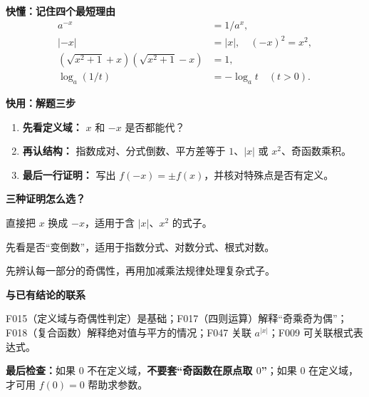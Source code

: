 \begin{summarybox}
\textbf{\textcolor{CSummary}{快懂：记住四个最短理由}}
\[
\begin{aligned}
 a^{-x}&=1/a^x,\\
 |{-x}|&=|x|,\quad(-x)^2=x^2,\\
 (\sqrt{x^2+1}+x)(\sqrt{x^2+1}-x)&=1,\\
 \log_a(1/t)&=-\log_a t\quad(t>0).
\end{aligned}
\]

\textbf{\textcolor{CSummary}{快用：解题三步}}
\begin{enumerate}[leftmargin=*,itemsep=.25em]
 \item \textbf{先看定义域：} $x$ 和 $-x$ 是否都能代？
 \item \textbf{再认结构：} 指数成对、分式倒数、平方差等于 $1$、$|x|$ 或 $x^2$、奇函数乘积。
 \item \textbf{最后一行证明：} 写出 $f(-x)=\pm f(x)$，并核对特殊点是否有定义。
\end{enumerate}

\textbf{\textcolor{CSummary}{三种证明怎么选？}}
\begin{description}[style=nextline,leftmargin=2.4em,labelsep=.5em,itemsep=.25em]
 \item[\textbf{门槛最低：}] 直接把 $x$ 换成 $-x$，适用于含 $|x|$、$x^2$ 的式子。
 \item[\textbf{最快：}] 先看是否“变倒数”，适用于指数分式、对数分式、根式对数。
 \item[\textbf{最能迁移：}] 先辨认每一部分的奇偶性，再用加减乘法规律处理复杂式子。
\end{description}

\textbf{\textcolor{CSummary}{与已有结论的联系}}

F015（定义域与奇偶性判定）是基础；F017（四则运算）解释“奇乘奇为偶”；F018（复合函数）解释绝对值与平方的情况；F047 关联 $a^{|x|}$；F009 可关联根式表达式。

\textbf{最后检查：}如果 $0$ 不在定义域，\textbf{不要套“奇函数在原点取 $0$”}；如果 $0$ 在定义域，才可用 $f(0)=0$ 帮助求参数。
\end{summarybox}
